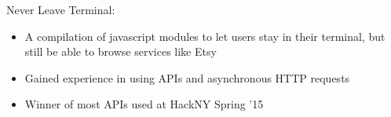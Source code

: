 \documentclass[11pt]{article}
\begin{document}
\headedsubsection
{Never Leave Terminal:}{}
{
    \begin{itemize}[leftmargin=0.5in]
        \item{A compilation of javascript modules to let users stay in their terminal, but still be able to browse services like Etsy}
        \item{Gained experience in using APIs and asynchronous HTTP requests}
        \item{Winner of most APIs used at HackNY Spring '15}
    \end{itemize}
}


\end{document}
